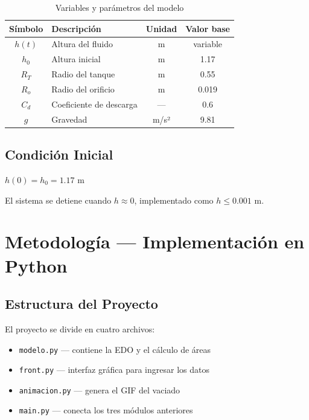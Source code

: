 \documentclass[12pt, a4paper]{article}
\begin{document}
\begin{table}[H]
    \centering
    \caption{Variables y parámetros del modelo}
    \begin{tabular}{clcc}
        \toprule
        \textbf{Símbolo} & \textbf{Descripción} & \textbf{Unidad} & \textbf{Valor base} \\
        \midrule
        $h(t)$  & Altura del fluido          & m      & variable \\
        $h_0$   & Altura inicial             & m      & 1.17     \\
        $R_T$   & Radio del tanque           & m      & 0.55     \\
        $R_o$   & Radio del orificio         & m      & 0.019    \\
        $C_d$   & Coeficiente de descarga    & ---    & 0.6      \\
        $g$     & Gravedad                   & m/s²   & 9.81     \\
        \bottomrule
    \end{tabular}
\end{table}

\subsection{Condición Inicial}

$h(0) = h_0 = 1.17 \text{ m}$

El sistema se detiene cuando $h \approx 0$, implementado como $h \leq 0.001$ m.

\section{Metodología — Implementación en Python}

\subsection{Estructura del Proyecto}

El proyecto se divide en cuatro archivos:

\begin{itemize}
    \item \texttt{modelo.py} — contiene la EDO y el cálculo de áreas
    \item \texttt{front.py} — interfaz gráfica para ingresar los datos
    \item \texttt{animacion.py} — genera el GIF del vaciado
    \item \texttt{main.py} — conecta los tres módulos anteriores
\end{itemize}
\end{document}
